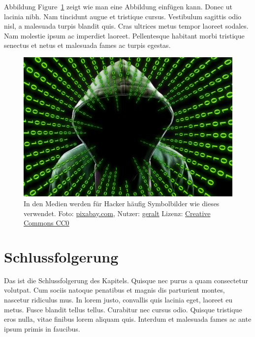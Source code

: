 \documentclass[listof=totoc,index=totoc,bibliography=totoc,12pt,ngerman,a4paper,]{report}
\begin{document}
Abbildung Figure~\ref{fig:my_fig} zeigt wie man eine Abbildung einfügen
kann. Donec ut lacinia nibh. Nam tincidunt augue et tristique cursus.
Vestibulum sagittis odio nisl, a malesuada turpis blandit quis. Cras
ultrices metus tempor laoreet sodales. Nam molestie ipsum ac imperdiet
laoreet. Pellentesque habitant morbi tristique senectus et netus et
malesuada fames ac turpis egestas.

\begin{figure}
\hypertarget{fig:my_fig}{%
\centering
\includegraphics[width=1\textwidth,height=\textheight]{source/figures/beispielbild.jpg}
\caption[Figure short caption]{In den Medien werden für Hacker häufig
Symbolbilder wie dieses verwendet. Foto:
\href{https://pixabay.com/photo-2883632/}{pixabay.com}, Nutzer:
\href{https://pixabay.com/de/users/geralt-9301/}{geralt} Lizenz:
\href{https://creativecommons.org/publicdomain/zero/1.0/deed.de}{Creative
Commons CC0} \label{mein_label}}\label{fig:my_fig}
}
\end{figure}

\section{Schlussfolgerung}\label{schlussfolgerung-1}

Das ist die Schlussfolgerung des Kapitels. Quisque nec purus a quam
consectetur volutpat. Cum sociis natoque penatibus et magnis dis
parturient montes, nascetur ridiculus mus. In lorem justo, convallis
quis lacinia eget, laoreet eu metus. Fusce blandit tellus tellus.
Curabitur nec cursus odio. Quisque tristique eros nulla, vitae finibus
lorem aliquam quis. Interdum et malesuada fames ac ante ipsum primis in
faucibus.
\end{document}
